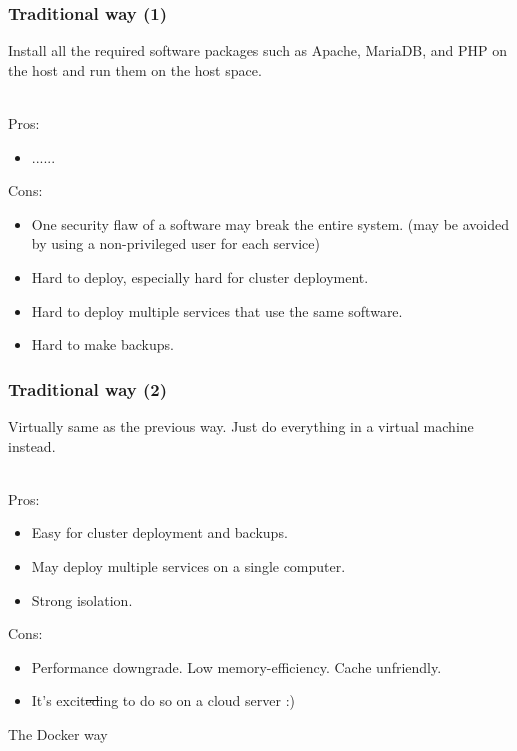 \documentclass{beamer}
\begin{document}
\begin{frame}
\frametitle{Traditional way (1)}
Install all the required software packages such as Apache, MariaDB, and PHP on
the host and run them on the host space.\\~

Pros:
\begin{itemize}
\item ......
\end{itemize}

Cons:
\begin{itemize}
\item One security flaw of a software may break the entire system. (may be
avoided by using a non-privileged user for each service)
\item Hard to deploy, especially hard for cluster deployment.
\item Hard to deploy multiple services that use the same software.
\item Hard to make backups.
\end{itemize}

\end{frame}


\begin{frame}
\frametitle{Traditional way (2)}
Virtually same as the previous way. Just do everything in a virtual machine
instead.\\~

Pros:
\begin{itemize}
\item Easy for cluster deployment and backups.
\item May deploy multiple services on a single computer.
\item Strong isolation.
\end{itemize}

Cons:
\begin{itemize}
\item Performance downgrade. Low memory-efficiency. Cache unfriendly.
\item It's excit\sout{ed}ing to do so on a cloud server :)
\end{itemize}

\end{frame}


\begin{frame}
\huge{\centerline{The Docker way}}
\end{frame}
\end{document}

